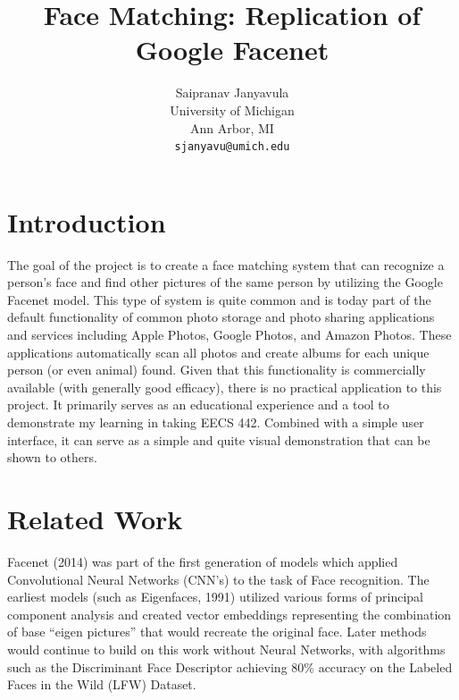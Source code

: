 \documentclass[10pt,twocolumn,letterpaper]{article}
\begin{document}
\title{Face Matching: Replication of Google Facenet}

\author{Saipranav Janyavula\\
University of Michigan\\
Ann Arbor, MI\\
{\tt\small sjanyavu@umich.edu}
}

\maketitle


\section{Introduction}
The goal of the project is to create a face matching system that can recognize a person's face and find other pictures of the same person by utilizing the Google Facenet model.
This type of system is quite common and is today part of the default functionality of common photo storage and photo sharing applications and services including Apple Photos, Google Photos, and Amazon Photos.
These applications automatically scan all photos and create albums for each unique person (or even animal) found. Given that this functionality is commercially available (with generally good efficacy), 
there is no practical application to this project. 
It primarily serves as an educational experience and a tool to demonstrate my learning in taking EECS 442.
Combined with a simple user interface, it can serve as a simple and quite visual demonstration that can be shown to others. 

\section{Related Work}
Facenet (2014) was part of the first generation of models which applied Convolutional Neural Networks (CNN's) to the task of Face recognition.
The earliest models (such as Eigenfaces, 1991) utilized various forms of principal component analysis and created vector embeddings representing the combination of base “eigen pictures” that would recreate the original face.
Later methods would continue to build on this work without Neural Networks, with algorithms such as the Discriminant Face Descriptor achieving 80\% accuracy on the Labeled Faces in the Wild (LFW) Dataset.\\
\end{document}
